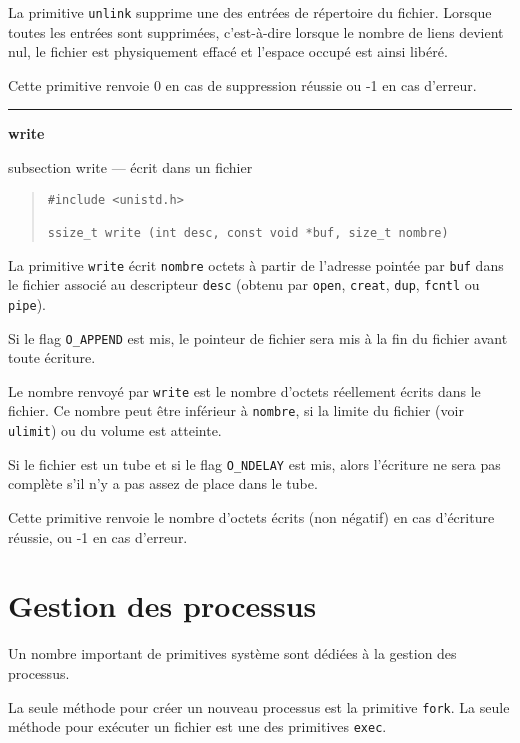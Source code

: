 \documentclass [twoside] {report}
\newcommand {\primitive} [1]
    {
	{\large \bf #1}
	\addcontentsline {toc} {subsection} {#1}
    }
\newcommand {\separation}
    {
	\vspace {7mm}
	\nopagebreak
	\hrule
    }
\begin{document}
La primitive {\tt unlink} supprime une des entrées
de répertoire du fichier. Lorsque toutes les
entrées sont supprimées, c'est-à-dire lorsque le
nombre de liens devient nul, le fichier est
physiquement effacé et l'espace occupé est ainsi
libéré.

Cette primitive renvoie 0 en cas de suppression
réussie ou -1 en cas d'erreur.




\separation
\primitive {write} --- écrit dans un fichier

\begin {quote}
\begin {verbatim}
#include <unistd.h>

ssize_t write (int desc, const void *buf, size_t nombre)
\end{verbatim}
\end {quote}

La primitive {\tt write} écrit {\tt nombre} octets à
partir de l'adresse pointée par {\tt buf} dans le
fichier associé au descripteur {\tt desc} (obtenu par
{\tt open}, {\tt creat}, {\tt dup}, {\tt fcntl} ou {\tt pipe}).

Si le flag {\tt O\_APPEND} est mis, le pointeur de
fichier sera mis à la fin du fichier avant toute
écriture.

Le nombre renvoyé par {\tt write} est le nombre
d'octets réellement écrits dans le fichier. Ce
nombre peut être inférieur à {\tt nombre}, si la
limite du fichier (voir {\tt ulimit}) ou du volume
est atteinte.

Si le fichier est un tube et si le flag
{\tt O\_NDELAY} est mis, alors l'écriture ne sera pas
complète s'il n'y a pas assez de place dans le
tube.

Cette primitive renvoie le nombre d'octets écrits
(non négatif) en cas d'écriture
réussie, ou -1 en cas d'erreur.



\section {Gestion des processus}


Un nombre important de primitives système sont
dédiées à la gestion des processus.

La seule méthode pour créer un nouveau processus
est la primitive {\tt fork}. La seule méthode pour
exécuter un fichier est une des primitives
{\tt exec}.
\end{document}
